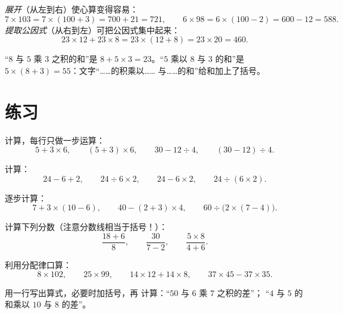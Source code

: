 \begin{example}[两个方向]\label{ex:g7:priorities:distributivity}
\emph{展开}（从左到右）使心算变得容易：
\[
7 \times 103 = 7 \times (100 + 3) = 700 + 21 = 721,
\qquad
6 \times 98 = 6 \times (100 - 2) = 600 - 12 = 588 .
\]
\emph{提取公因式}（从右到左）可把公因式集中起来：
\[
23 \times 12 + 23 \times 8 = 23 \times (12 + 8) = 23 \times 20 = 460 .
\]
\end{example}

\begin{example}[把文字译成算式]\label{ex:g7:priorities:words}
“$8$ 与 $5$ 乘 $3$ 之积的和”是 $8 + 5 \times 3 =
23$。“$5$ 乘以 $8$ 与 $3$ 的和”是
$5 \times (8 + 3) = 55$：文字“……的积乘以……
与……的和”给和加上了括号。
\end{example}

\section{练习}

\begin{exercise}[$\star$]\label{exo:g7:priorities:1}
计算，每行只做一步运算：
\[
5 + 3 \times 6, \qquad
(5 + 3) \times 6, \qquad
30 - 12 \div 4, \qquad
(30 - 12) \div 4 .
\]
\end{exercise}

\begin{exercise}[$\star$]\label{exo:g7:priorities:2}
计算：
\[
24 - 6 + 2, \qquad
24 \div 6 \times 2, \qquad
24 - 6 \times 2, \qquad
24 \div (6 \times 2).
\]
\end{exercise}

\begin{exercise}[$\star$]\label{exo:g7:priorities:3}
逐步计算：
\[
7 + 3 \times (10 - 6), \qquad
40 - (2 + 3) \times 4, \qquad
60 \div \bigl(2 \times (7 - 4)\bigr).
\]
\end{exercise}

\begin{exercise}[$\star$]\label{exo:g7:priorities:4}
计算下列分数（注意分数线相当于括号！）：
\[
\frac{18 + 6}{8}, \qquad
\frac{30}{7 - 2}, \qquad
\frac{5 \times 8}{4 + 6} .
\]
\end{exercise}

\begin{exercise}[$\star$]\label{exo:g7:priorities:5}
利用分配律口算：
\[
8 \times 102, \qquad
25 \times 99, \qquad
14 \times 12 + 14 \times 8, \qquad
37 \times 45 - 37 \times 35 .
\]
\end{exercise}

\begin{exercise}[$\star$]\label{exo:g7:priorities:6}
用一行写出算式，必要时加括号，再
计算：“$50$ 与 $6$ 乘 $7$ 之积的差”；
“$4$ 与 $5$ 的和乘以 $10$ 与
$8$ 的差”。
\end{exercise}


